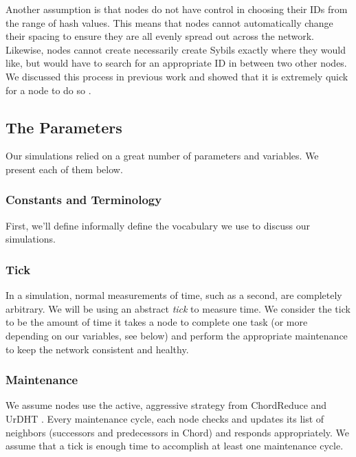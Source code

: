 \documentclass[11pt,conference]{IEEEtran}
\begin{document}
Another assumption is that nodes do not have control in choosing their IDs from the range of hash values.
This means that nodes cannot automatically change their spacing to ensure they are all evenly spread out across the network.
Likewise, nodes cannot create necessarily create Sybils exactly where they would like, but would have to search for an appropriate ID in between two other nodes.
We discussed this process in previous work and showed that it is extremely quick for a node to do so \cite{sybil-analysis}.





%
%
%


\subsection{The Parameters}

Our simulations relied on a great number of parameters and variables.
We present each of them below.

\subsubsection{Constants and Terminology}

First, we'll define informally define the vocabulary we use to discuss our simulations.

\subsubsection*{Tick} In a simulation, normal measurements of time, such as a second, are completely arbitrary.  
We will be using an abstract \textit{tick} to measure time.  
We consider the tick to be the amount of time it takes a node to complete one task (or more depending on our variables, see below) and perform the appropriate maintenance to keep the network consistent and healthy.

\subsubsection*{Maintenance} We assume nodes use the active, aggressive strategy from ChordReduce and UrDHT \cite{chordreduce} \cite{urdht}.
Every maintenance cycle, each node checks and updates its list of neighbors (successors and predecessors in Chord) and responds appropriately. 
We assume that a tick is enough time to accomplish at least one maintenance cycle.
\end{document}
